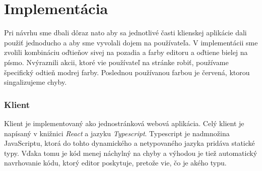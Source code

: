 \chapter{Implementácia}
Pri návrhu sme dbali dôraz nato aby sa jednotlivé časti klienskej aplikácie dali použiť jednoducho
a aby sme vyvolali dojem na používateľa. V implementácii sme zvolili kombináciu oďtieňov sivej na
pozadia a farby editoru a oďtiene bielej na písmo. Nvýraznili akcii, ktoré vie používateľ na stránke
robiť, používame špecifický odtieň modrej farby. Poslednou používanou farbou je červená, ktorou
singalizujeme chyby.

\subsection{Klient}
Klient je implementovaný ako jednostránková webová aplikácia. Celý klient je napísaný v knižnici
\textit{React} a jazyku \textit{Typescript}. Typescript je nadmnožina JavaScriptu, ktorá do tohto
dynamického a netypovaného jazyka pridáva statické typy. Vďaka tomu je kód menej náchylný na chyby
a výhodou je tiež automatický navrhovanie kódu, ktorý editor poskytuje, pretože vie, čo je akého
typu. 

